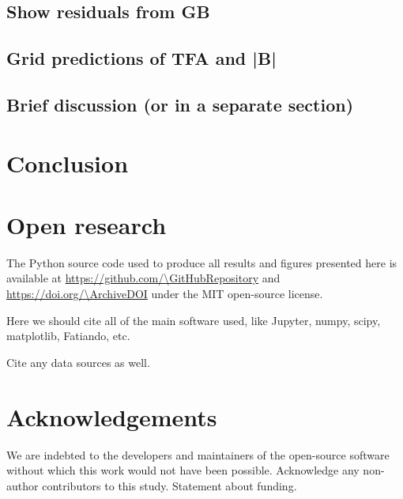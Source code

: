 \subsection{Show residuals from GB}

\subsection{Grid predictions of TFA and |B|}

\subsection{Brief discussion (or in a separate section)}



\section{Conclusion}

\lipsum[1]


\section{Open research}

The Python source code used to produce all results and figures presented here
is available at \url{https://github.com/\GitHubRepository} and
\url{https://doi.org/\ArchiveDOI} under the MIT open-source license.

Here we should cite all of the main software used, like Jupyter, numpy, scipy,
matplotlib, Fatiando, etc.

Cite any data sources as well.

\section{Acknowledgements}

We are indebted to the developers and maintainers of the open-source software
without which this work would not have been possible.
Acknowledge any non-author contributors to this study.
Statement about funding.

